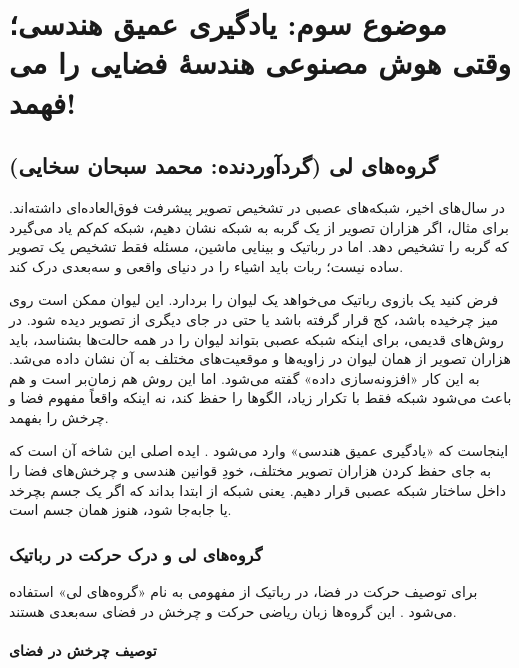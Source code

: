 \documentclass{article}
\begin{document}


\tableofcontents \clearpage
\newpage

\section{موضوع سوم: یادگیری عمیق هندسی؛ وقتی هوش مصنوعی هندسۀ فضایی را می فهمد!}
\subsection{گروه‌های لی 
(گردآوردنده: محمد سبحان سخایی)}

در سال‌های اخیر، شبکه‌های عصبی در تشخیص تصویر پیشرفت فوق‌العاده‌ای داشته‌اند. برای مثال، اگر هزاران تصویر از یک گربه به شبکه نشان دهیم، شبکه کم‌کم یاد می‌گیرد که گربه را تشخیص دهد. اما در رباتیک و بینایی ماشین، مسئله فقط تشخیص یک تصویر ساده نیست؛ ربات باید اشیاء را در دنیای واقعی و سه‌بعدی درک کند.

فرض کنید یک بازوی رباتیک می‌خواهد یک لیوان را بردارد. این لیوان ممکن است روی میز چرخیده باشد، کج قرار گرفته باشد یا حتی در جای دیگری از تصویر دیده شود. در روش‌های قدیمی، برای اینکه شبکه عصبی بتواند لیوان را در همه حالت‌ها بشناسد، باید هزاران تصویر از همان لیوان در زاویه‌ها و موقعیت‌های مختلف به آن نشان داده می‌شد. به این کار «افزونه‌سازی داده»  گفته می‌شود. اما این روش هم زمان‌بر است و هم باعث می‌شود شبکه فقط با تکرار زیاد، الگوها را حفظ کند، نه اینکه واقعاً مفهوم فضا و چرخش را بفهمد.

اینجاست که «یادگیری عمیق هندسی»  وارد می‌شود \cite{bronstein2021geometric}. ایده اصلی این شاخه آن است که به جای حفظ کردن هزاران تصویر مختلف، خودِ قوانین هندسی و چرخش‌های فضا را داخل ساختار شبکه عصبی قرار دهیم. یعنی شبکه از ابتدا بداند که اگر یک جسم بچرخد یا جابه‌جا شود، هنوز همان جسم است.

\subsubsection{گروه‌های لی و درک حرکت در رباتیک}

برای توصیف حرکت در فضا، در رباتیک از مفهومی به نام «گروه‌های لی»  استفاده می‌شود \cite{sola2018micro}. این گروه‌ها زبان ریاضی حرکت و چرخش در فضای سه‌بعدی هستند.

\paragraph{توصیف چرخش در فضای }
\end{document}
